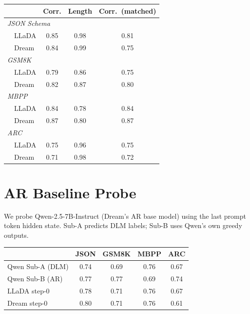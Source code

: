 \documentclass[11pt]{article}
\providecommand{\linenumbers}{}
\providecommand{\nolinenumbers}{}
\begin{document}
\nolinenumbers
\begin{center}
  \small
  \label{tab:length_control}
  \begin{tabular}{lccc}
    \toprule
    & \textbf{Corr.} & \textbf{Length} & \textbf{Corr.\ (matched)} \\
    \midrule
    \multicolumn{4}{l}{\textit{JSON Schema}} \\
    ~~LLaDA & 0.85 & 0.98 & 0.81 \\
    ~~Dream & 0.84 & 0.99 & 0.75 \\
    \midrule
    \multicolumn{4}{l}{\textit{GSM8K}} \\
    ~~LLaDA & 0.79 & 0.86 & 0.75 \\
    ~~Dream & 0.82 & 0.87 & 0.80 \\
    \midrule
    \multicolumn{4}{l}{\textit{MBPP}} \\
    ~~LLaDA & 0.84 & 0.78 & 0.84 \\
    ~~Dream & 0.87 & 0.80 & 0.87 \\
    \midrule
    \multicolumn{4}{l}{\textit{ARC}} \\
    ~~LLaDA & 0.75 & 0.96 & 0.75 \\
    ~~Dream & 0.71 & 0.98 & 0.72 \\
    \bottomrule
  \end{tabular}
\end{center}
\linenumbers

\section{AR Baseline Probe}
\label{sec:appendix_ar}

We probe Qwen-2.5-7B-Instruct (Dream's AR base model) using the last prompt token hidden state. Sub-A predicts DLM labels; Sub-B uses Qwen's own greedy outputs.

\nolinenumbers
\begin{center}
  \small
  \setlength{\tabcolsep}{4pt}
  \label{tab:ar_probe}
  \begin{tabular}{@{}lcccc@{}}
    \toprule
    & \textbf{JSON} & \textbf{GSM8K} & \textbf{MBPP} & \textbf{ARC} \\
    \midrule
    Qwen Sub-A (DLM) & 0.74 & 0.69 & 0.76 & 0.67 \\
    Qwen Sub-B (AR) & 0.77 & 0.77 & 0.69 & 0.74 \\
    \midrule
    LLaDA step-0 & 0.78 & 0.71 & 0.76 & 0.67 \\
    Dream step-0 & 0.80 & 0.71 & 0.76 & 0.61 \\
    \bottomrule
  \end{tabular}
\end{center}
\linenumbers
\end{document}
